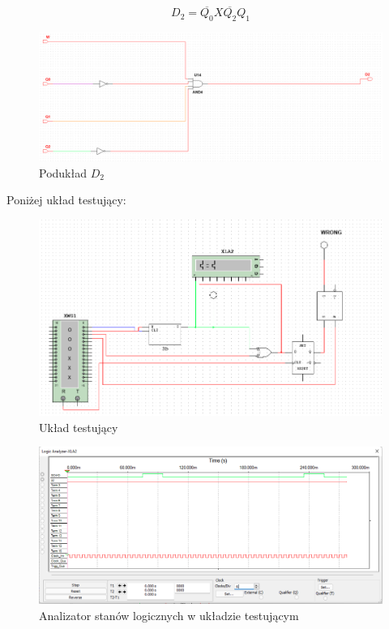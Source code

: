 \documentclass{article}
\begin{document}
$$D_2 = \overline{Q_0}X\overline{Q_2}Q_1$$

\begin{figure}[H]
    \centering
    \includegraphics[width=\textwidth]{3c_impl_2.png}
    \caption{Podukład $D_2$}
\end{figure}

\pagebreak
Poniżej układ testujący:

\begin{figure}[H]
    \centering
    \includegraphics[width=\textwidth]{3c_test.png}
    \caption{Układ testujący}
\end{figure}

\begin{figure}[H]
    \centering
    \includegraphics[width=\textwidth]{3c_test_ana.png}
    \caption{Analizator stanów logicznych w układzie testującym}
\end{figure}
\end{document}
